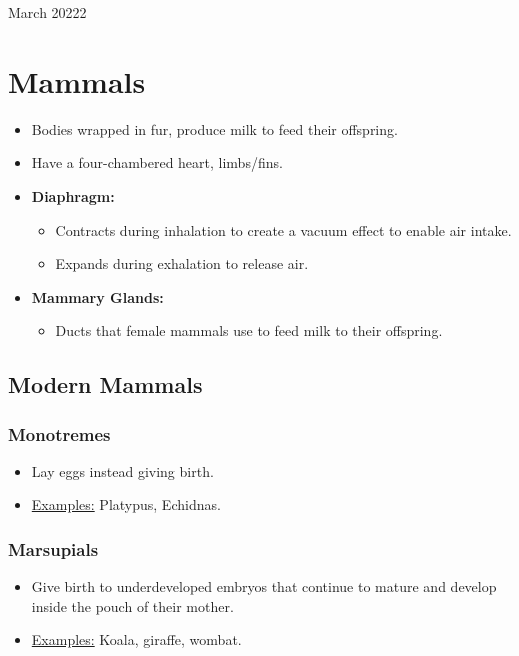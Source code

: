 \documentclass[12pt,oneside]{book} %
\begin{document}
\begin{lec}{March 20222}
  \section*{Mammals}
  \begin{itemize}
    \item Bodies wrapped in fur, produce milk to feed their offspring.
    \item Have a four-chambered heart, limbs/fins.
    \item \textbf{Diaphragm:}
    \begin{itemize}
      \item Contracts during inhalation to create a vacuum effect to enable air intake.
      \item Expands during exhalation to release air.
    \end{itemize}
    \item \textbf{Mammary Glands:}
    \begin{itemize}
      \item Ducts that female mammals use to feed milk to their offspring.
    \end{itemize}
  \end{itemize}

  \subsection*{Modern Mammals}
  
   \subsubsection*{Monotremes}
   \begin{itemize}
     \item Lay eggs instead giving birth.
     \item \underline{Examples:} Platypus, Echidnas.
   \end{itemize}
   
   \subsubsection*{Marsupials}
   \begin{itemize}
     \item Give birth to underdeveloped embryos that continue to mature and develop inside the pouch of their mother.
     \item \underline{Examples:} Koala, giraffe, wombat.
   \end{itemize}


\end{lec}
\end{document}
